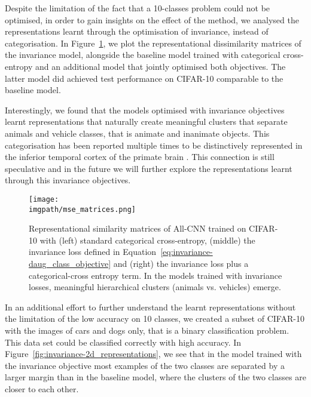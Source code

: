 {Despite the limitation of the fact that a 10-classes problem could not be optimised, in order to gain insights on the effect of the method, we analysed the representations learnt through the optimisation of invariance, instead of categorisation. In Figure~\ref{fig:invariance-mse_matrices}, we plot the representational dissimilarity matrices of the invariance model, alongside the baseline model trained with categorical cross-entropy and an additional model that jointly optimised both objectives. The latter model did achieved test performance on CIFAR-10 comparable to the baseline model. 

Interestingly, we found that the models optimised with invariance objectives learnt representations that naturally create meaningful clusters that separate animals and vehicle classes, that is animate and inanimate objects. This categorisation has been reported multiple times to be distinctively represented in the inferior temporal cortex of the primate brain \citep{kriegeskorte2008manandmonkey, bao2020itmaps}. This connection is still speculative and in the future we will further explore the representations learnt through this invariance objectives.

\begin{figure}[ht]
  \begin{center}
    \texttt{[image: \\imgpath/mse\_matrices.png]}
  \end{center}
  \caption{Representational similarity matrices of All-CNN trained on CIFAR-10 with (left) standard categorical cross-entropy, (middle) the invariance loss defined in Equation~\ref{eq:invariance-daug_class_objective} and (right) the invariance loss plus a categorical-cross entropy term. In the models trained with invariance losses, meaningful hierarchical clusters (animals vs. vehicles) emerge.}
  \label{fig:invariance-mse_matrices}
\end{figure}

In an additional effort to further understand the learnt representations without the limitation of the low accuracy on 10 classes, we created a subset of CIFAR-10 with the images of cars and dogs only, that is a binary classification problem. This data set could be classified correctly with high accuracy. In Figure~\ref{fig:invariance-2d_representations}, we see that in the model trained with the invariance objective most examples of the two classes are separated by a larger margin than in the baseline model, where the clusters of the two classes are closer to each other.

}
